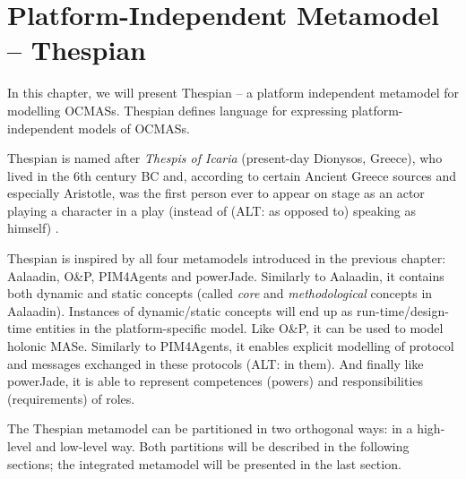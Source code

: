 
\chapter{Platform-Independent Metamodel -- Thespian}

In this chapter, we will present Thespian -- a platform independent metamodel for modelling OCMASs.
Thespian defines language for expressing platform-independent models of OCMASs.

Thespian is named after \textit{Thespis of Icaria} (present-day Dionysos, Greece), who lived in the 6th century BC and, according to certain Ancient Greece sources and especially Aristotle, was the first person ever to appear on stage as an actor playing a character in a play (instead of (ALT: as opposed to) speaking as himself) \cite{Wikipedia-Thespis}.

Thespian is inspired by all four metamodels introduced in the previous chapter: Aalaadin, O\&P, PIM4Agents and powerJade.
Similarly to Aalaadin, it contains both dynamic and static concepts (called \textit{core} and \textit{methodological} concepts in Aalaadin). Instances of dynamic/static concepts will end up as run-time/design-time entities in the platform-specific model.
Like O\&P, it can be used to model holonic MASe.
Similarly to PIM4Agents, it enables explicit modelling of protocol and messages exchanged in these protocols (ALT: in them). 
And finally like powerJade, it is able to represent competences (powers) and responsibilities (requirements) of roles.

The Thespian metamodel can be partitioned in two orthogonal ways: in a high-level and low-level way.
Both partitions will be described in the following sections; the integrated metamodel will be presented in the last section.

